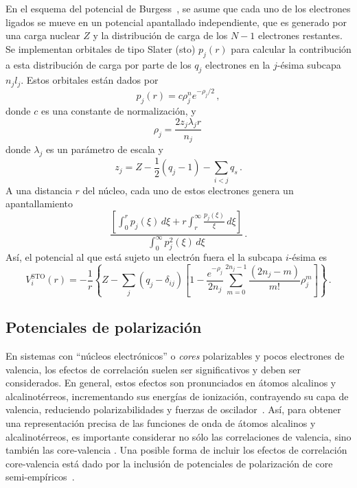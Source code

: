 En el esquema del potencial de Burgess~\cite{Burgess:89}, se asume que 
cada uno de los electrones ligados se mueve en un potencial apantallado 
independiente, que es generado por una carga nuclear $Z$ y la 
distribución de carga de los $N-1$ electrones restantes. Se implementan 
orbitales de tipo Slater (\acs{sto}) $p_j(r)$ para calcular la 
contribución a esta distribución de carga por parte de los $q_j$ 
electrones en la $j$-ésima subcapa $n_jl_j$. Estos orbitales están dados 
por
\begin{equation}
p_j(r) = c\rho_j^n e^{-\rho_j/2}\,,
\end{equation}
donde $c$ es una constante de normalización, y 
\begin{equation}
\rho_j= \frac{2z_j\lambda_jr}{n_j}\,
\end{equation}
donde $\lambda_j$ es un parámetro de escala y 
\begin{equation}
z_j=Z-\frac{1}{2}\left(q_j-1\right)-\sum_{i<j} q_s\,.
\end{equation}
A una distancia $r$ del núcleo, cada uno de estos electrones genera un 
apantallamiento 
\begin{equation}
\frac{\left[\int_0^r p_j(\xi)\,d\xi +r\int_r^{\infty}
\frac{p_j(\xi)}{\xi}\,d\xi\right]}{\int_0^{\infty}p_j^2(\xi)\,d\xi}\,.
\end{equation}
Así, el potencial al que está sujeto un electrón fuera el la subcapa 
$i$-ésima es
\begin{equation}
V_i^{\textrm{STO}}(r)=-\frac{1}{r}\left\{Z-\sum_j(q_j-\delta_{ij})\left[1-
\frac{e^{-\rho_j}}{2n_j}\sum_{m=0}^{2n_j-1}\frac{(2n_j-m)}{m!}\rho_j^m
\right]\right\}\,.
\label{eq:STO-pot}
\end{equation}

\subsection{Potenciales de polarización}

En sistemas con ``núcleos electrónicos'' o \textit{cores} polarizables y 
pocos electrones de valencia, los efectos de correlación suelen ser 
significativos y deben ser considerados. En general, estos efectos son 
pronunciados en átomos alcalinos y alcalinotérreos, incrementando sus 
energías de ionización, contrayendo su capa de valencia, reduciendo 
polarizabilidades y fuerzas de oscilador~\cite{Muller:83}. 
Así, para obtener una representación precisa de las funciones de onda de 
átomos alcalinos y alcalinotérreos, es importante considerar no sólo las 
correlaciones de valencia, sino también las core-valencia 
\cite{Bartschat:04}. Una posible forma de incluir los efectos de 
correlación core-valencia está dado por la inclusión de potenciales de 
polarización de core semi-empíricos~\cite{Loughlin:88}.

